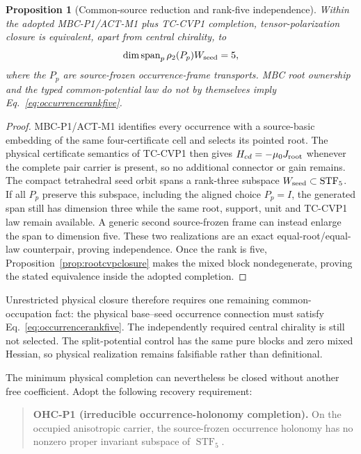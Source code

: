 \documentclass[11pt]{article}
\newtheorem{proposition}{Proposition}
\begin{document}
\begin{proposition}[Common-source reduction and rank-five independence]
\label{prop:commonsourcereduction}
Within the adopted MBC-P1/ACT-M1 plus TC-CVP1 completion, tensor-polarization
closure is equivalent, apart from central chirality, to
\begin{equation}
 \dim\operatorname{span}_p\rho_2(P_p)W_{\rm seed}=5,
 \label{eq:occurrencerankfive}
\end{equation}
where the $P_p$ are source-frozen occurrence-frame transports. MBC root
ownership and the typed common-potential law do not by themselves imply
Eq.~\eqref{eq:occurrencerankfive}.
\end{proposition}

\begin{proof}
MBC-P1/ACT-M1 identifies every occurrence with a source-basic embedding of
the same four-certificate cell and selects its pointed root. The physical
certificate semantics of TC-CVP1 then gives
$H_{cd}=-\mu_0J_{\rm root}$ whenever the complete pair carrier is present,
so no additional connector or gain remains. The compact tetrahedral seed
orbit spans a rank-three subspace $W_{\rm seed}\subset\operatorname{STF}_5$.
If all $P_p$ preserve this subspace, including the aligned choice $P_p=I$,
the generated span still has dimension three while the same root, support,
unit and TC-CVP1 law remain available. A generic second source-frozen frame
can instead enlarge the span to dimension five. These two realizations are
an exact equal-root/equal-law counterpair, proving independence. Once the
rank is five, Proposition~\ref{prop:rootcvpclosure} makes the mixed block
nondegenerate, proving the stated equivalence inside the adopted completion.
\end{proof}

Unrestricted physical closure therefore requires one remaining common-occupation
fact: the physical base--seed occurrence connection must satisfy
Eq.~\eqref{eq:occurrencerankfive}. The independently required central
chirality is still not selected. The split-potential control
has the same pure blocks and zero mixed Hessian, so physical realization remains
falsifiable rather than definitional.

The minimum physical completion can nevertheless be closed without another
free coefficient. Adopt the following recovery requirement:

\begin{quote}
\textbf{OHC-P1 (irreducible occurrence-holonomy completion).}
On the occupied anisotropic carrier, the source-frozen occurrence holonomy
has no nonzero proper invariant subspace of $\operatorname{STF}_5$.
\end{quote}
\end{document}
